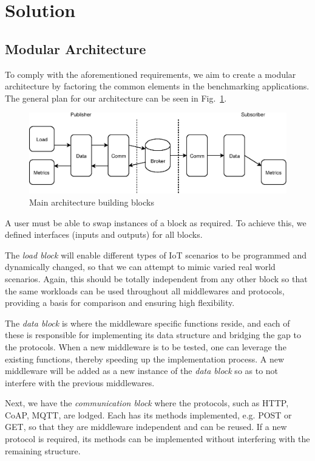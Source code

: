 \documentclass[conference]{IEEEtran}
\begin{document}
\section{Solution}

\subsection{Modular Architecture}

To comply with the aforementioned requirements, we aim to create a modular architecture by factoring the common elements in the benchmarking applications. The general plan for our architecture can be seen in Fig.~\ref{fig:benchmark_architecture}.

\begin{figure}[htbp!]
  \centering
  \includegraphics[width=\linewidth]{figures/benchmark_architecture.eps}
  \caption{Main architecture building blocks}
  \label{fig:benchmark_architecture}
\end{figure}

A user must be able to swap instances of a block as required. To achieve this, we defined interfaces (inputs and outputs) for all blocks. 

The \textit{load block} will enable different types of IoT scenarios to be programmed and dynamically changed, so that we can attempt to mimic varied real world scenarios. Again, this should be totally independent from any other block so that the same workloads can be used throughout all middlewares and protocols, providing a basis for comparison and ensuring high flexibility. 
    
The \textit{data block} is where the middleware specific functions reside, and each of these is responsible for implementing its data structure and bridging the gap to the protocols. When a new middleware is to be tested, one can leverage the existing functions, thereby speeding up the implementation process. A new middleware will be added as a new instance of the \textit{data block} so as to not interfere with the previous middlewares.

Next, we have the \textit{communication block} where the protocols, such as HTTP, CoAP, MQTT, are lodged. Each has its methods implemented, e.g. POST or GET, so that they are middleware independent and can be reused. If a new protocol is required, its methods can be implemented without interfering with the remaining structure.
\end{document}
